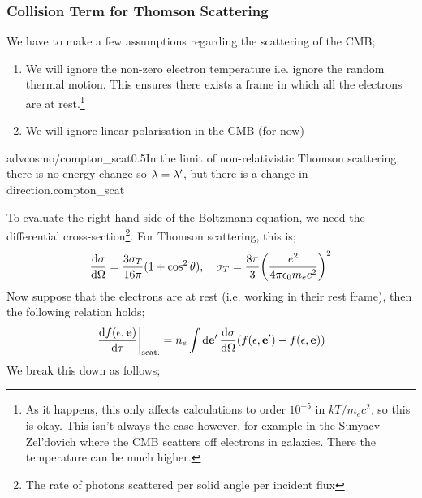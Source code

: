\subsubsection*{Collision Term for Thomson Scattering}
We have to make a few assumptions regarding the scattering of the CMB;
\begin{enumerate}
\item We will ignore the non-zero electron temperature i.e. ignore the random thermal motion. This ensures there exists a frame in which all the electrons are at rest.\footnote{As it happens, this only affects calculations to order $10^{-5}$ in $kT/ m_e c^2$, so this is okay. This isn't always the case however, for example in the Sunyaev-Zel'dovich where the CMB scatters off electrons in galaxies. There the temperature can be much higher.}
\item We will ignore linear polarisation in the CMB (for now)
\end{enumerate}
\begin{mygraphic}{advcosmo/compton_scat}{0.5}{In the limit of non-relativistic Thomson scattering, there is no energy change so $\lambda = \lambda^{\prime}$, but there is a change in direction.}{compton_scat}\end{mygraphic}
To evaluate the right hand side of the Boltzmann equation, we need the differential cross-section\footnote{The rate of photons scattered per solid angle per incident flux}. For Thomson scattering, this is;
\begin{equation}
\frac{\ud \sigma}{\ud \Omega} = \frac{3\sigma_T}{16\pi}(1 + \cos^2 \theta), \quad \sigma_T = \frac{8\pi}{3}\left(\frac{e^2}{4\pi \epsilon_0 m_e c^2}\right)^2
\end{equation}
Now suppose that the electrons are at rest (i.e. working in their rest frame), then the following relation holds;
\begin{equation*}
\left.\frac{\ud f(\epsilon, \vec e)}{\ud \tau}\right|_{\text{scat.}} = n_e \int{\upd{\vec{e}\pr}\frac{\ud \sigma}{\ud \Omega}\left(f(\epsilon, \vec{e}\pr) - f(\epsilon, \vec{e})\right)}
\end{equation*}
We break this down as follows;
